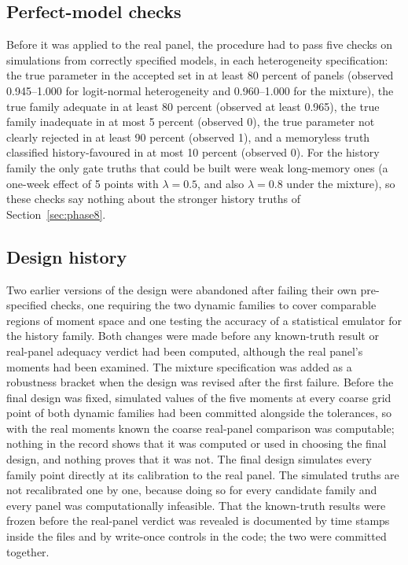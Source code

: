 \documentclass[11pt]{article}
\begin{document}
\subsection{Perfect-model checks}
Before it was applied to the real panel, the procedure had to pass five checks
on simulations from correctly specified models, in each heterogeneity specification: the true
parameter in the accepted set in at least 80 percent of panels (observed 0.945--1.000 for
logit-normal heterogeneity and 0.960--1.000 for the mixture), the true family adequate in at least 80
percent (observed at least 0.965), the true family inadequate in at most 5 percent (observed 0), the
true parameter not clearly rejected in at least 90 percent (observed 1), and a memoryless truth
classified history-favoured in at most 10 percent (observed 0). For the history family the only
gate truths that could be built were weak long-memory ones (a one-week effect of 5 points with
$\lambda=0.5$, and also $\lambda=0.8$ under the mixture), so these checks say nothing about the
stronger history truths of Section~\ref{sec:phase8}.

\subsection{Design history}
Two earlier versions of the design were abandoned after failing
their own pre-specified checks, one requiring the two dynamic families to cover comparable
regions of moment space and one testing the accuracy of a statistical emulator for the history
family. Both changes were made before any known-truth result or real-panel adequacy verdict had
been computed, although the real panel's moments had been examined. The mixture specification
was added as a robustness bracket when the design was revised after the first failure. Before
the final design was fixed, simulated values of the five moments at every coarse grid point of
both dynamic families had been committed alongside the tolerances, so with the real moments
known the coarse real-panel comparison was computable; nothing in the record shows that it was
computed or used in choosing the final design, and nothing proves that it was not. The final design simulates every family point directly at its
calibration to the real panel. The simulated truths are not recalibrated one by one, because doing so
for every candidate family and every panel was computationally infeasible. That the known-truth
results were frozen before the real-panel verdict was revealed is documented by time stamps
inside the files and by write-once controls in the code; the two were committed together.
\end{document}
